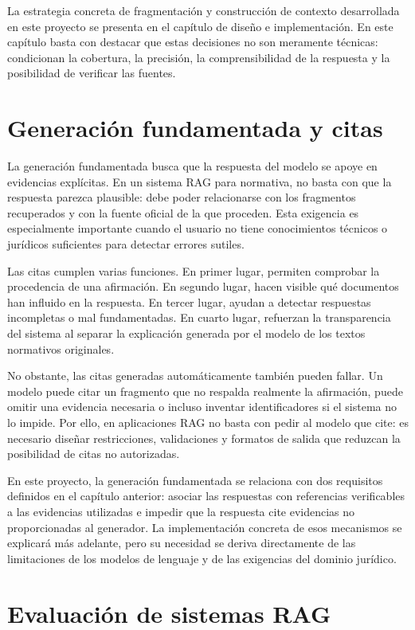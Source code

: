 La estrategia concreta de fragmentación y construcción de contexto desarrollada en este proyecto se presenta en el capítulo de diseño e implementación. En este capítulo basta con destacar que estas decisiones no son meramente técnicas: condicionan la cobertura, la precisión, la comprensibilidad de la respuesta y la posibilidad de verificar las fuentes.

\section{Generación fundamentada y citas}
\label{sec:generacion-fundamentada-citas}

La generación fundamentada busca que la respuesta del modelo se apoye en evidencias explícitas. En un sistema RAG para normativa, no basta con que la respuesta parezca plausible: debe poder relacionarse con los fragmentos recuperados y con la fuente oficial de la que proceden. Esta exigencia es especialmente importante cuando el usuario no tiene conocimientos técnicos o jurídicos suficientes para detectar errores sutiles.

Las citas cumplen varias funciones. En primer lugar, permiten comprobar la procedencia de una afirmación. En segundo lugar, hacen visible qué documentos han influido en la respuesta. En tercer lugar, ayudan a detectar respuestas incompletas o mal fundamentadas. En cuarto lugar, refuerzan la transparencia del sistema al separar la explicación generada por el modelo de los textos normativos originales.

No obstante, las citas generadas automáticamente también pueden fallar. Un modelo puede citar un fragmento que no respalda realmente la afirmación, puede omitir una evidencia necesaria o incluso inventar identificadores si el sistema no lo impide. Por ello, en aplicaciones RAG no basta con pedir al modelo que cite: es necesario diseñar restricciones, validaciones y formatos de salida que reduzcan la posibilidad de citas no autorizadas.

En este proyecto, la generación fundamentada se relaciona con dos requisitos definidos en el capítulo anterior: asociar las respuestas con referencias verificables a las evidencias utilizadas e impedir que la respuesta cite evidencias no proporcionadas al generador. La implementación concreta de esos mecanismos se explicará más adelante, pero su necesidad se deriva directamente de las limitaciones de los modelos de lenguaje y de las exigencias del dominio jurídico.

\section{Evaluación de sistemas RAG}
\label{sec:evaluacion-rag}

